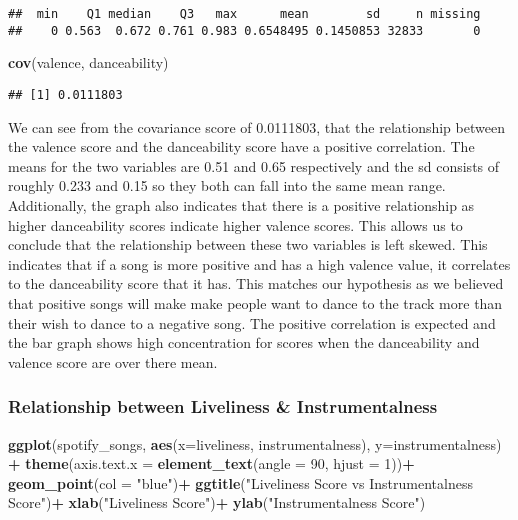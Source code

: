 \documentclass[
]{article}
\newenvironment{Shaded}{\begin{snugshade}}{\end{snugshade}}
\newcommand{\DataTypeTok}[1]{\textcolor[rgb]{0.13,0.29,0.53}{#1}}
\newcommand{\DecValTok}[1]{\textcolor[rgb]{0.00,0.00,0.81}{#1}}
\newcommand{\KeywordTok}[1]{\textcolor[rgb]{0.13,0.29,0.53}{\textbf{#1}}}
\newcommand{\NormalTok}[1]{#1}
\newcommand{\OperatorTok}[1]{\textcolor[rgb]{0.81,0.36,0.00}{\textbf{#1}}}
\newcommand{\StringTok}[1]{\textcolor[rgb]{0.31,0.60,0.02}{#1}}
\begin{document}
\begin{verbatim}
##  min    Q1 median    Q3   max      mean        sd     n missing
##    0 0.563  0.672 0.761 0.983 0.6548495 0.1450853 32833       0
\end{verbatim}

\begin{Shaded}
\begin{Highlighting}[]
\KeywordTok{cov}\NormalTok{(valence, danceability)}
\end{Highlighting}
\end{Shaded}

\begin{verbatim}
## [1] 0.0111803
\end{verbatim}

We can see from the covariance score of 0.0111803, that the relationship
between the valence score and the danceability score have a positive
correlation. The means for the two variables are 0.51 and 0.65
respectively and the sd consists of roughly 0.233 and 0.15 so they both
can fall into the same mean range. Additionally, the graph also
indicates that there is a positive relationship as higher danceability
scores indicate higher valence scores. This allows us to conclude that
the relationship between these two variables is left skewed. This
indicates that if a song is more positive and has a high valence value,
it correlates to the danceability score that it has. This matches our
hypothesis as we believed that positive songs will make make people want
to dance to the track more than their wish to dance to a negative song.
The positive correlation is expected and the bar graph shows high
concentration for scores when the danceability and valence score are
over there mean.

\hypertarget{relationship-between-liveliness-instrumentalness}{%
\subsubsection{Relationship between Liveliness \&
Instrumentalness}\label{relationship-between-liveliness-instrumentalness}}

\begin{Shaded}
\begin{Highlighting}[]
\KeywordTok{ggplot}\NormalTok{(spotify_songs, }\KeywordTok{aes}\NormalTok{(}\DataTypeTok{x=}\NormalTok{liveliness, instrumentalness), }\DataTypeTok{y=}\NormalTok{instrumentalness) }\OperatorTok{+}\StringTok{  }\KeywordTok{theme}\NormalTok{(}\DataTypeTok{axis.text.x =} \KeywordTok{element_text}\NormalTok{(}\DataTypeTok{angle =} \DecValTok{90}\NormalTok{, }\DataTypeTok{hjust =} \DecValTok{1}\NormalTok{))}\OperatorTok{+}
\StringTok{  }\KeywordTok{geom_point}\NormalTok{(}\DataTypeTok{col =} \StringTok{"blue"}\NormalTok{)}\OperatorTok{+}
\StringTok{  }\KeywordTok{ggtitle}\NormalTok{(}\StringTok{"Liveliness Score vs Instrumentalness Score"}\NormalTok{)}\OperatorTok{+}
\StringTok{  }\KeywordTok{xlab}\NormalTok{(}\StringTok{"Liveliness Score"}\NormalTok{)}\OperatorTok{+}
\StringTok{  }\KeywordTok{ylab}\NormalTok{(}\StringTok{"Instrumentalness Score"}\NormalTok{)}
\end{Highlighting}
\end{Shaded}
\end{document}
